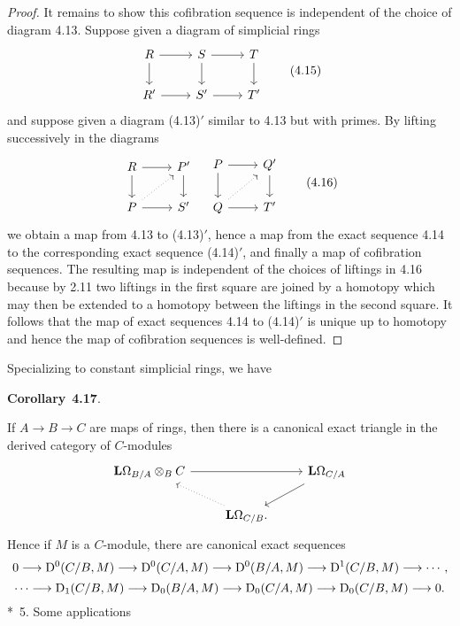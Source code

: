 \documentclass[10pt,reqno]{amsart}
\newenvironment{env}[2]{
\par\medskip\noindent\textbf{#1}~\textbf{#2}.\,\itshape
}
\newcommand{\lra}{\longrightarrow}
\renewcommand{\L}{\mathbf{L}}
\newcommand{\D}{\mathrm{D}}
\newcommand{\Diff}{\Omega}
\newcommand{\LD}{\L\Diff}
\begin{document}
\begin{proof}
It remains to show this cofibration sequence is independent of the choice of diagram 4.13. Suppose given a diagram of
simplicial rings
\[
  \begin{tikzcd}
    R\ar[r]\ar[d] & S\ar[r]\ar[d] & T\ar[d]\\
    R'\ar[r] & S'\ar[r] & T'
  \end{tikzcd}
  \tag{4.15}
\]
and suppose given a diagram (4.13)$'$ similar to 4.13 but with primes. By lifting successively in the diagrams
\[
  \begin{tikzcd}
    R\ar[r]\ar[d] & P'\ar[d]\\
    P\ar[ur,dotted]\ar[r] & S'
  \end{tikzcd}
  \quad
  \begin{tikzcd}
    P\ar[r]\ar[d] & Q'\ar[d]\\
    Q\ar[ur,dotted]\ar[r] & T'
  \end{tikzcd}
  \tag{4.16}
\]
we obtain a map from 4.13 to (4.13)$'$, hence a map from the exact sequence 4.14 to the corresponding exact sequence
(4.14)$'$, and finally a map of cofibration sequences. The resulting map is independent of the choices of liftings in
4.16 because by 2.11 two liftings in the first square are joined by a homotopy which may then be extended to a homotopy
between the liftings in the second square. It follows that the map of exact sequences 4.14 to (4.14)$'$ is unique up to
homotopy and hence the map of cofibration sequences is well-defined.
\end{proof}

Specializing to constant simplicial rings, we have
\begin{env}{Corollary}{4.17}
If $A\to B\to C$ are maps of rings, then there is a canonical exact triangle in the derived category of $C$-modules
\[
  \begin{tikzcd}
    \LD_{B/A}\otimes_B C\ar[rr] & & \LD_{C/A}\ar[ld]\\
    & \LD_{C/B}\ar[ul,dotted].
  \end{tikzcd}
\]
Hence if $M$ is a $C$-module, there are canonical exact sequences
\[
  0\lra\D^0(C/B,M)\lra\D^0(C/A,M)\lra\D^0(B/A,M)\lra\D^1(C/B,M)\lra\cdots,
\]
\[
  \cdots\lra\D_1(C/B,M)\lra\D_0(B/A,M)\lra\D_0(C/A,M)\lra\D_0(C/B,M)\lra 0.
\]
\end{env}

\subsection*{\textsection~5. Some applications}
\end{document}
